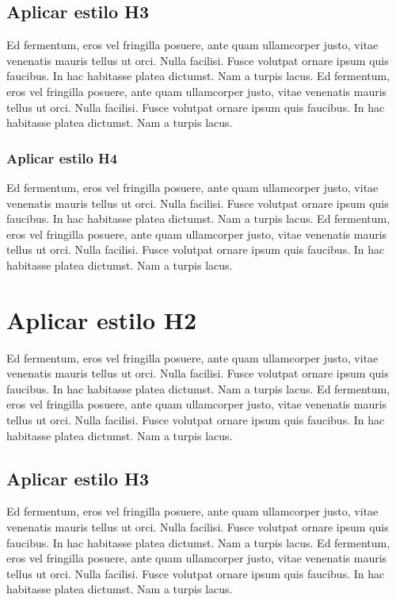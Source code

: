\documentclass[10.5pt,17.35pt,a4paper]{article}
\begin{document}
\subsection{Aplicar estilo H3}

Ed fermentum, \citep{Faria1989, Wong2005, Goncalves2019} eros vel fringilla posuere, ante quam ullamcorper justo, vitae venenatis mauris tellus ut orci. Nulla facilisi. Fusce volutpat ornare ipsum quis faucibus. In hac habitasse platea dictumst. Nam a turpis lacus. Ed fermentum, eros vel fringilla posuere, ante quam ullamcorper justo, vitae venenatis mauris tellus ut orci. Nulla facilisi. Fusce volutpat ornare ipsum quis faucibus. In hac habitasse platea dictumst. Nam a turpis lacus.

\subsubsection{Aplicar estilo H4}
 
Ed fermentum, eros vel fringilla posuere, ante quam ullamcorper justo, vitae venenatis mauris tellus ut orci. Nulla facilisi. Fusce volutpat ornare ipsum quis faucibus. In hac habitasse platea dictumst. Nam a turpis lacus. Ed fermentum, eros vel fringilla posuere, ante quam ullamcorper justo, vitae venenatis mauris tellus ut orci. Nulla facilisi. Fusce volutpat ornare ipsum quis faucibus. In hac habitasse platea dictumst. Nam a turpis lacus. 

\section{Aplicar estilo H2}

Ed fermentum, eros vel fringilla posuere, ante quam ullamcorper justo, vitae venenatis mauris tellus ut orci. Nulla facilisi. Fusce volutpat ornare ipsum quis faucibus. In hac habitasse platea dictumst. Nam a turpis lacus. Ed fermentum, eros vel fringilla posuere, ante quam ullamcorper justo, vitae venenatis mauris tellus ut orci. Nulla facilisi. Fusce volutpat ornare ipsum quis faucibus. In hac habitasse platea dictumst. Nam a turpis lacus. 

\subsection{Aplicar estilo H3}

Ed fermentum, eros vel fringilla posuere, ante quam ullamcorper justo, vitae venenatis mauris tellus ut orci. Nulla facilisi. Fusce volutpat ornare ipsum quis faucibus. In hac habitasse platea dictumst. Nam a turpis lacus. Ed fermentum, eros vel fringilla posuere, ante quam ullamcorper justo, vitae venenatis mauris tellus ut orci. Nulla facilisi. Fusce volutpat ornare ipsum quis faucibus. In hac habitasse platea dictumst. Nam a turpis lacus.
\end{document}
